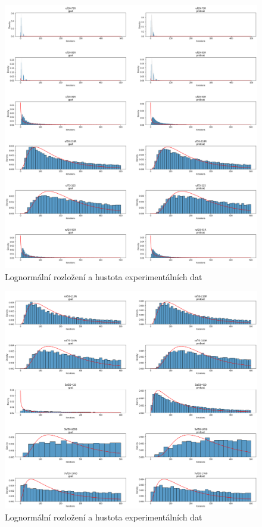 \documentclass[twoside,twocolumn]{article}
\begin{document}
    \begin{figure}[h]
        \includegraphics[width=\textwidth]{images/gsat_probsat_pdf_lognormal-1}
        \caption{Lognormální rozložení a hustota experimentálních dat}
        \label{fig:lognormal1}
    \end{figure}

    \begin{figure}[h]
        \includegraphics[width=\textwidth]{images/gsat_probsat_pdf_lognormal-2}
        \caption{Lognormální rozložení a hustota experimentálních dat}
        \label{fig:lognormal2}
    \end{figure}
\end{document}
